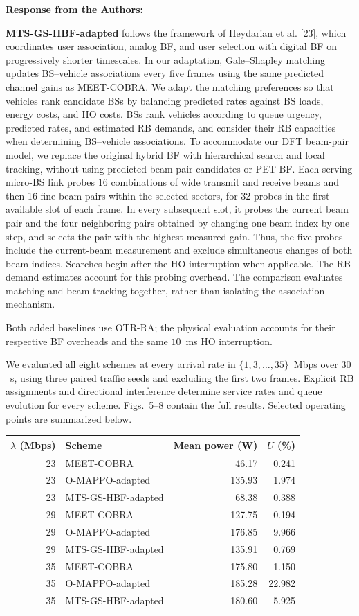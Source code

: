 \documentclass[11pt]{article}
\newenvironment{reviewedit}[1]
{\colorlet{responseblue}{#1}\colorlet{changeblue}{#1}\color{#1}}
{}
\newenvironment{authorresponse}
{\par\noindent\textcolor{responseblue}{\textbf{Response from the Authors:}}\par\color{responseblue}}
{\par}
\begin{document}
\begin{reviewedit}{red}
\begin{authorresponse}
\textbf{MTS-GS-HBF-adapted} follows the framework of Heydarian et al. [23],
which coordinates user association, analog BF, and user selection with
digital BF on progressively shorter timescales. In our adaptation,
Gale--Shapley matching updates BS--vehicle associations every five frames
using the same predicted channel gains as MEET-COBRA. We adapt the matching preferences so that vehicles rank
candidate BSs by balancing predicted rates against BS loads, energy costs,
and HO costs. BSs rank vehicles according to queue urgency, predicted rates,
and estimated RB demands, and consider their RB capacities when determining
BS--vehicle associations. To accommodate our DFT beam-pair model, we replace the
original hybrid BF with hierarchical search and local tracking, without using
predicted beam-pair candidates or PET-BF. Each serving micro-BS link probes
16 combinations of wide transmit and receive beams and then 16 fine beam pairs
within the selected sectors, for 32 probes in the first available slot of
each frame. In every subsequent slot, it probes the current beam pair and
the four neighboring pairs obtained by changing one beam index by one step,
and selects the pair with the highest measured gain. Thus, the five probes
include the current-beam measurement and exclude simultaneous changes of
both beam indices. Searches begin after the HO interruption when applicable.
The RB demand estimates account for this probing overhead. The comparison
evaluates matching and beam tracking together, rather than isolating the
association mechanism.

Both added baselines use OTR-RA; the physical evaluation accounts for their
respective BF overheads and the same $10$~ms HO interruption.

We evaluated all eight schemes at every arrival rate in
$\{1,3,\ldots,35\}$~Mbps over $30$~s, using three paired traffic seeds and
excluding the first two frames. Explicit RB assignments and directional
interference determine service rates and queue evolution for every scheme.
Figs.~5--8 contain the full results. Selected operating points are summarized below.

\begin{center}
\small
\begin{tabular}{rlrr}
\hline
$\lambda$ (Mbps) & Scheme & Mean power (W) & $U$ (\%) \\
\hline
23 & MEET-COBRA & 46.17 & 0.241 \\
23 & O-MAPPO-adapted & 135.93 & 1.974 \\
23 & MTS-GS-HBF-adapted & 68.38 & 0.388 \\
29 & MEET-COBRA & 127.75 & 0.194 \\
29 & O-MAPPO-adapted & 176.85 & 9.966 \\
29 & MTS-GS-HBF-adapted & 135.91 & 0.769 \\
35 & MEET-COBRA & 175.80 & 1.150 \\
35 & O-MAPPO-adapted & 185.28 & 22.982 \\
35 & MTS-GS-HBF-adapted & 180.60 & 5.925 \\
\hline
\end{tabular}
\end{center}


\end{authorresponse}
\end{reviewedit}
\end{document}
